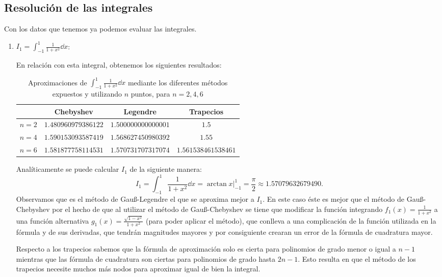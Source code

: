 \documentclass[a4paper]{article}
\begin{document}
\subsection*{Resolución de las integrales}
Con los datos que tenemos ya podemos evaluar las integrales.
\begin{enumerate}
    \item $\displaystyle I_1=\int_{-1}^1\frac{1}{1+x^2}\dd x$:\par
    En relación con esta integral, obtenemos los siguientes resultados:
    \begin{table}[ht]
        \centering
        \captionsetup{width=0.9\textwidth}
        \begin{tabular}{|c|c|c|c|}
            \cline{2-4}
            \multicolumn{1}{c|}{} & Chebyshev & Legendre & Trapecios \\
            \hline
            $n=2$ & $1.480960979386122$ & $1.500000000000001$ & $1.5$ \\
            \hline
            $n=4$ & $1.590153093587419$ & $1.568627450980392$  & $1.55$ \\
            \hline
            $n=6$ & $1.581877758114531$ & $1.570731707317074$ & $1.561538461538461$ \\
            \hline
        \end{tabular}
        \caption{Aproximaciones de $\int_{-1}^1\frac{1}{1+x^2}\dd x$ mediante los diferentes métodos expuestos y utilizando $n$ puntos, para $n=2,4,6$}
    \end{table}\par
    Analíticamente se puede calcular $I_1$ de la siguiente manera:
    $$I_1=\int_{-1}^1\frac{1}{1+x^2}\dd x=\arctan x\Big|_{-1}^1=\frac{\pi}{2}\approx 1.57079632679490.$$ Observamos que es el método de Gau\ss-Legendre el que se aproxima mejor a $I_1$. En este caso éste es mejor que el método de Gau\ss-Chebyshev por el hecho de que al utilizar el método de Gau\ss-Chebyshev se tiene que modificar la función integrando $f_1(x)=\frac{1}{1+x^2}$ a una función alternativa $g_1(x)=\frac{\sqrt{1-x^2}}{1+x^2}$ (para poder aplicar el método), que conlleva a una complicación de la función utilizada en la fórmula y de sus derivadas, que tendrán magnitudes mayores y por consiguiente crearan un error de la fórmula de cuadratura mayor.\par Respecto a los trapecios sabemos que la fórmula de aproximación solo es cierta para polinomios de grado menor o igual a $n-1$ mientras que las fórmula de cuadratura son ciertas para polinomios de grado hasta $2n-1$. Esto resulta en que el método de los trapecios necesite muchos más nodos para aproximar igual de bien la integral.

\end{enumerate}
\end{document}
